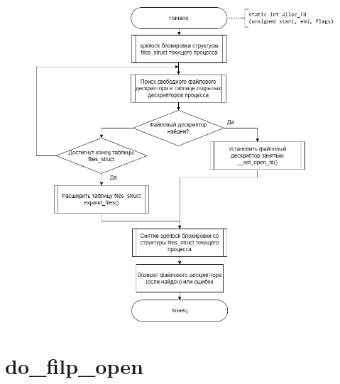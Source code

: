 \documentclass[12pt]{report}
\begin{document}
	\begin{figure}[H]
		\centering
		\includegraphics[scale=0.7]{alloc_fd}
	\end{figure}
	
	\section{do\_filp\_open}
	
\end{document}
